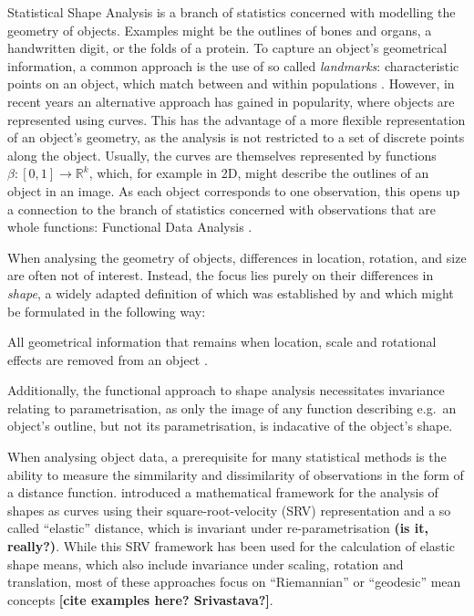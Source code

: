 Statistical Shape Analysis \parencite[see e.g.][]{DrydenMardia2016} is a branch of statistics concerned with modelling the geometry of objects.
Examples might be the outlines of bones and organs, a handwritten digit, or the folds of a protein.
To capture an object's geometrical information, a common approach is the use of so called \textit{landmarks}: characteristic points on an object, which match between and within populations \parencite[see][3]{DrydenMardia2016}.
However, in recent years an alternative approach has gained in popularity, where objects are represented using curves.
This has the advantage of a more flexible representation of an object's geometry, as the analysis is not restricted to a set of discrete points along the object.
Usually, the curves are themselves represented by functions $\beta : [0,1] \rightarrow \mathbb{R}^k$, which, for example in 2D, might describe the outlines of an object in an image. 
As each object corresponds to one observation, this opens up a connection to the branch of statistics concerned with observations that are whole functions: Functional Data Analysis \parencite[see e.g.][]{RamsaySilverman2005}.

When analysing the geometry of objects, differences in location, rotation, and size are often not of interest.
Instead, the focus lies purely on their differences in  \textit{shape}, a widely adapted definition of which was established by \cite{Kendall1977} and which might be formulated in the following way:
\begin{definition}[Shape] 
    All geometrical information that remains when location, scale and rotational effects are removed from an object \parencite[see][1]{DrydenMardia2016}.
\end{definition}
\noindent Additionally, the functional approach to shape analysis necessitates invariance relating to parametrisation, as only the image of any function describing e.g.\ an object's outline, but not its parametrisation, is indacative of the object's shape.

When analysing object data, a prerequisite for many statistical methods is the ability to measure the simmilarity and dissimilarity of observations in the form of a distance function.
\cite{SrivastavaEtAl2011} introduced a mathematical framework for the analysis of shapes as curves using their square-root-velocity (SRV) representation and a so called \enquote{elastic} distance, which is invariant under re-parametrisation \textbf{(is it, really?)}.
While this SRV framework has been used for the calculation of elastic shape means, which also include invariance under scaling, rotation and translation, most of these approaches focus on \enquote{Riemannian} or \enquote{geodesic} mean concepts \textbf{[cite examples here? Srivastava?]}.

